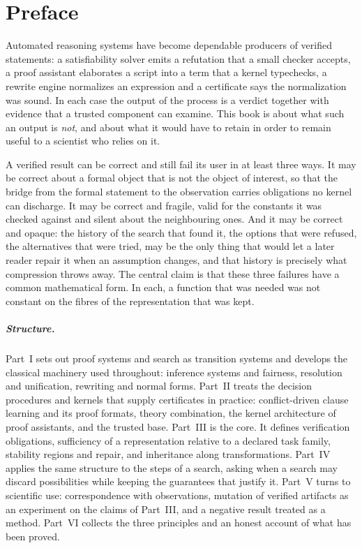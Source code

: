 \chapter*{Preface}

Automated reasoning systems have become dependable producers of verified statements: a satisfiability solver emits a refutation that a small checker accepts, a proof assistant elaborates a script into a term that a kernel typechecks, a rewrite engine normalizes an expression and a certificate says the normalization was sound. In each case the output of the process is a verdict together with evidence that a trusted component can examine. This book is about what such an output is \emph{not}, and about what it would have to retain in order to remain useful to a scientist who relies on it.

A verified result can be correct and still fail its user in at least three ways. It may be correct about a formal object that is not the object of interest, so that the bridge from the formal statement to the observation carries obligations no kernel can discharge. It may be correct and fragile, valid for the constants it was checked against and silent about the neighbouring ones. And it may be correct and opaque: the history of the search that found it, the options that were refused, the alternatives that were tried, may be the only thing that would let a later reader repair it when an assumption changes, and that history is precisely what compression throws away. The central claim is that these three failures have a common mathematical form. In each, a function that was needed was not constant on the fibres of the representation that was kept.

\paragraph{Structure.} Part~I sets out proof systems and search as transition systems and develops the classical machinery used throughout: inference systems and fairness, resolution and unification, rewriting and normal forms. Part~II treats the decision procedures and kernels that supply certificates in practice: conflict-driven clause learning and its proof formats, theory combination, the kernel architecture of proof assistants, and the trusted base. Part~III is the core. It defines verification obligations, sufficiency of a representation relative to a declared task family, stability regions and repair, and inheritance along transformations. Part~IV applies the same structure to the steps of a search, asking when a search may discard possibilities while keeping the guarantees that justify it. Part~V turns to scientific use: correspondence with observations, mutation of verified artifacts as an experiment on the claims of Part~III, and a negative result treated as a method. Part~VI collects the three principles and an honest account of what has been proved.

